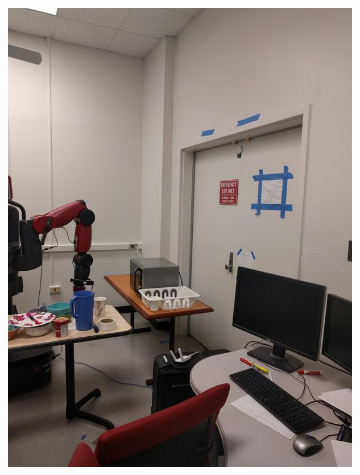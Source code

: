 \documentclass[12pt]{article}
\begin{document}
\begin{figure}[t!]
\begin{subfigure}[t]{0.1\textwidth}
        \includegraphics[width=\linewidth]{../Images/Set3/6}
    \end{subfigure}
    \begin{subfigure}[t]{0.1\textwidth}
        \centering

\end{subfigure}
\end{figure}
\end{document}
